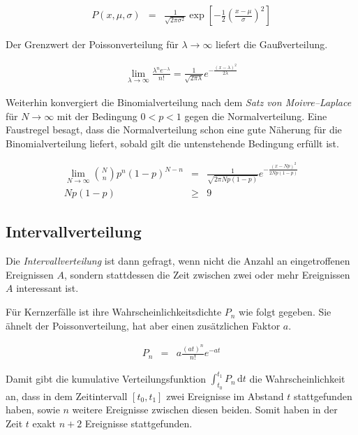 \documentclass[12pt,a4paper]{scrartcl}
\numberwithin{equation}{section} %
\renewcommand{\[}{} %
\renewcommand{\]}{\noindent} %
\begin{document}
\begin{eqnarray}
	P(x,\mu,\sigma) &=& \frac{1}{\sqrt{2 \pi\sigma^2}} \exp\left[- \frac{1}{2} \left(\frac{x - \mu}{\sigma}\right)^2\right]
\end{eqnarray}

\noindent
Der Grenzwert der Poissonverteilung für $\lambda \rightarrow \infty$ liefert die Gaußverteilung.

\begin{eqnarray}
	\lim_{\lambda \rightarrow \infty} \frac{\lambda^n e^{-\lambda}}{n!} = \frac{1}{\sqrt{2 \pi \lambda}} e^{- \frac{(x-\lambda)^2}{2\lambda}}
\end{eqnarray}

\noindent
Weiterhin konvergiert die Binomialverteilung nach dem \emph{Satz von Moivre--Laplace} für $N \rightarrow \infty$ mit der Bedingung $0 < p < 1$ gegen die Normalverteilung. Eine Faustregel besagt, dass die Normalverteilung schon eine gute Näherung für die Binomialverteilung liefert, sobald gilt die untenstehende Bedingung erfüllt ist.

\begin{eqnarray}
	\lim_{N \rightarrow \infty} \binom{N}{n} p^n (1-p)^{N-n}
		&=& \frac{1}{\sqrt{2 \pi N p (1-p)}} e^{- \frac{(x - Np)^2}{2 N p (1-p)}} \\
	Np (1-p) &\geq& 9
\end{eqnarray}

\hypertarget{Intervallverteilung}{\subsection{Intervallverteilung}\label{Intervallverteilung}}
Die \emph{Intervallverteilung} ist dann gefragt, wenn nicht die Anzahl an eingetroffenen Ereignissen $A$, sondern stattdessen die Zeit zwischen zwei oder mehr Ereignissen $A$ interessant ist.

Für Kernzerfälle ist ihre Wahrscheinlichkeitsdichte $P_n$ wie folgt gegeben. Sie ähnelt der Poissonverteilung, hat aber einen zusätzlichen Faktor $a$.

\begin{eqnarray}
	P_n &=& a \frac{(at)^n}{n!} e^{-at} \label{eq:Intervallverteilung}
\end{eqnarray}

\noindent
Damit gibt die kumulative Verteilungsfunktion $\int_{t_0}^{t_1} P_n \,\mathrm dt \label{eq:P_n_int}$ die Wahrscheinlichkeit an, dass in dem Zeitintervall $[t_0,t_1]$ zwei Ereignisse im Abstand $t$ stattgefunden haben, sowie $n$ weitere Ereignisse zwischen diesen beiden. Somit haben in der Zeit $t$ exakt $n+2$ Ereignisse stattgefunden.
\end{document}
